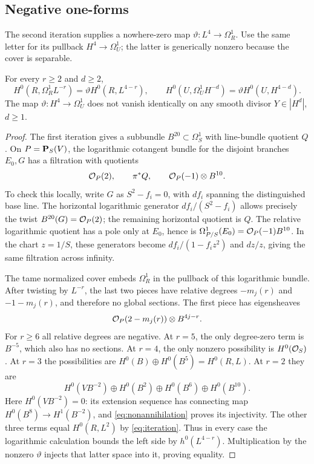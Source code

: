 \subsection{Negative one-forms}

The second iteration supplies a nowhere-zero map $\vartheta:L^4\to\Omega_R^1$. Use the same letter for its pullback $H^4\to\Omega_U^1$; the latter is generically nonzero because the cover is separable.

\begin{lemma}\label{lem:threefold-forms}
For every $r\ge2$ and $d\ge2$,
\[
 H^0(R,\Omega_R^1L^{-r})=\vartheta H^0(R,L^{4-r}),\qquad
 H^0(U,\Omega_U^1H^{-d})=\vartheta H^0(U,H^{4-d}).
\]
The map $\vartheta:H^4\to\Omega_U^1$ does not vanish identically on any smooth divisor $Y\in|H^d|$, $d\ge1$.
\end{lemma}
\begin{proof}
The first iteration gives a subbundle $B^{20}\subset\Omega_S^1$ with line-bundle quotient $Q$. On $P=\mathbf P_S(V)$, the logarithmic cotangent bundle for the disjoint branches $E_0,G$ has a filtration with quotients
\[
 \mathcal O_P(2),\qquad \pi^*Q,\qquad \mathcal O_P(-1)\otimes B^{10}.
\]
To check this locally, write $G$ as $S^2-f_i=0$, with $df_i$ spanning the distinguished base line. The horizontal logarithmic generator $df_i/(S^2-f_i)$ allows precisely the twist $B^{20}(G)=\mathcal O_P(2)$; the remaining horizontal quotient is $Q$. The relative logarithmic quotient has a pole only at $E_0$, hence is $\Omega^1_{P/S}(E_0)=\mathcal O_P(-1)B^{10}$. In the chart $z=1/S$, these generators become $df_i/(1-f_i z^2)$ and $dz/z$, giving the same filtration across infinity.

The tame normalized cover embeds $\Omega_R^1$ in the pullback of this logarithmic bundle. After twisting by $L^{-r}$, the last two pieces have relative degrees $-m_j(r)$ and $-1-m_j(r)$, and therefore no global sections. The first piece has eigensheaves
\[
 \mathcal O_P(2-m_j(r))\otimes B^{4j-r}.
\]
For $r\ge6$ all relative degrees are negative. At $r=5$, the only degree-zero term is $B^{-5}$, which also has no sections. At $r=4$, the only nonzero possibility is $H^0(\mathcal O_S)$. At $r=3$ the possibilities are $H^0(B)\oplus H^0(B^5)=H^0(R,L)$. At $r=2$ they are
\[
 H^0(VB^{-2})\oplus H^0(B^2)\oplus H^0(B^6)\oplus H^0(B^{10}).
\]
Here $H^0(VB^{-2})=0$: its extension sequence has connecting map $H^0(B^8)\to H^1(B^{-2})$, and \eqref{eq:nonannihilation} proves its injectivity. The other three terms equal $H^0(R,L^2)$ by \eqref{eq:iteration}. Thus in every case the logarithmic calculation bounds the left side by $h^0(L^{4-r})$. Multiplication by the nonzero $\vartheta$ injects that latter space into it, proving equality.


\end{proof}
